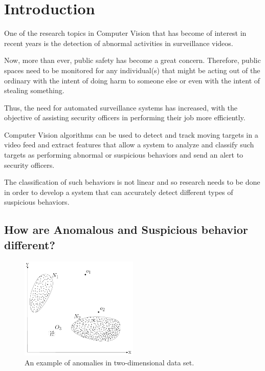 \chapter{Introduction}\label{ch:introduction}

One of the research topics in Computer Vision that has become of interest in recent years is the detection of abnormal activities in surveillance videos. 

Now, more than ever, public safety has become a great concern. Therefore, public spaces need to be monitored for any individual(s) that might be acting out of the ordinary with the intent of doing harm to someone else or even with the intent of stealing something.

Thus, the need for automated surveillance systems has increased, with the objective of assisting security officers in performing their job more efficiently.

Computer Vision algorithms can be used to detect and track moving targets in a video feed and extract features that allow a system to analyze and classify such targets as performing abnormal or suspicious behaviors and send an alert to security officers.

The classification of such behaviors is not linear and so research needs to be done in order to develop a system that can accurately detect different types of suspicious behaviors.

\section{How are Anomalous and Suspicious behavior different?}

\begin{figure}
  \centering
  \includegraphics[width=0.5\textwidth]{figures/Anomalies_in_2D_data.png}
  \caption{An example of anomalies in two-dimensional data set.}
  \label{fig:AnomaliesExample1}
\end{figure}

